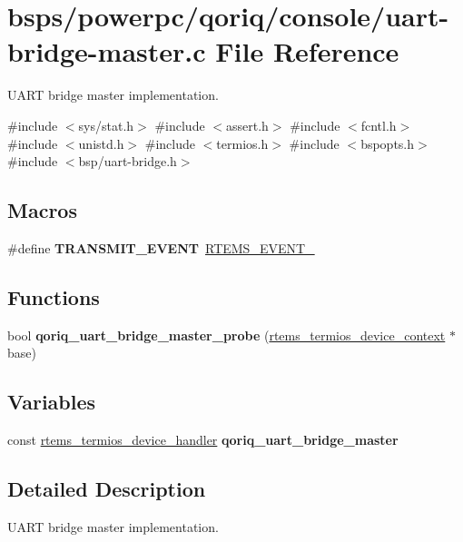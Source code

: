 \hypertarget{uart-bridge-master_8c}{}\section{bsps/powerpc/qoriq/console/uart-\/bridge-\/master.c File Reference}
\label{uart-bridge-master_8c}


U\+A\+RT bridge master implementation.  


{\ttfamily \#include $<$sys/stat.\+h$>$}\newline
{\ttfamily \#include $<$assert.\+h$>$}\newline
{\ttfamily \#include $<$fcntl.\+h$>$}\newline
{\ttfamily \#include $<$unistd.\+h$>$}\newline
{\ttfamily \#include $<$termios.\+h$>$}\newline
{\ttfamily \#include $<$bspopts.\+h$>$}\newline
{\ttfamily \#include $<$bsp/uart-\/bridge.\+h$>$}\newline
\subsection*{Macros}
\begin{DoxyCompactItemize}
\item 
\mbox{\label{uart-bridge-master_8c_afdc4093304d7f6a402c1917f8d7b191a}} 
\#define {\bfseries T\+R\+A\+N\+S\+M\+I\+T\+\_\+\+E\+V\+E\+NT}~\mbox{\hyperlink{group__ClassicEventSet_gadab2e575c5b836fcd51a2d50443fefea}{R\+T\+E\+M\+S\+\_\+\+E\+V\+E\+N\+T\+\_}}
\end{DoxyCompactItemize}
\subsection*{Functions}
\begin{DoxyCompactItemize}
\item 
bool {\bfseries qoriq\+\_\+uart\+\_\+bridge\+\_\+master\+\_\+probe} (\mbox{\hyperlink{structrtems__termios__device__context}{rtems\+\_\+termios\+\_\+device\+\_\+context}} $\ast$base)
\end{DoxyCompactItemize}
\subsection*{Variables}
\begin{DoxyCompactItemize}
\item 
const \mbox{\hyperlink{structrtems__termios__device__handler}{rtems\+\_\+termios\+\_\+device\+\_\+handler}} {\bfseries qoriq\+\_\+uart\+\_\+bridge\+\_\+master}
\end{DoxyCompactItemize}


\subsection{Detailed Description}
U\+A\+RT bridge master implementation. 

